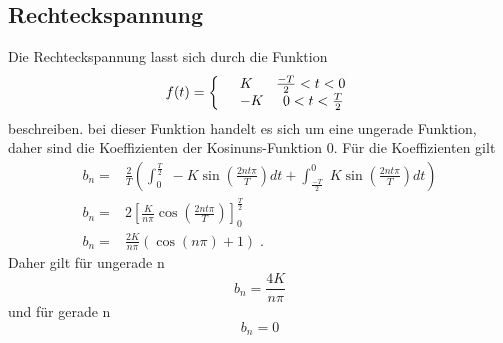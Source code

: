 \subsection{Rechteckspannung}
\label{sec:Rechteckspannung}
Die Rechteckspannung lasst sich durch die Funktion
\begin{equation*}
  f(t)=\left\{
  \begin{array}{l l}
    &K   \;\;\;\;\;\;\frac{-T}{2}<t<0 \\
    &-K  \;\;\;\;\;0<t<\frac{T}{2}
  \end{array}
  \right.
\end{equation*}
beschreiben. bei dieser Funktion handelt es sich um eine ungerade Funktion, daher
sind die Koeffizienten der Kosinuns-Funktion $0$. Für die Koeffizienten gilt
\begin{align*}
  b_n=&\frac{2}{T}\left(\int^{\frac{T}{2}}_0\;-K\sin\left(\frac{2nt\pi}{T}\right)dt+
\int^0_{\frac{-T}{2}}\;K\sin\left(\frac{2nt\pi}{T}\right)dt\right)\\
  b_n=&2\left[ \frac{K}{n\pi}\cos\left(\frac{2nt\pi}{T}\right)\right]^{\frac{T}{2}}_0\\
  b_n=&\frac{2K}{n\pi}(\cos(n\pi)+1)\;.
\end{align*}
Daher gilt für ungerade n
\begin{equation}
  b_n=\frac{4K}{n\pi}
\end{equation}
 und für gerade n
\begin{equation}
  b_n=0
\end{equation}
